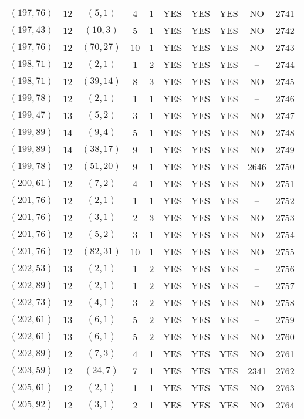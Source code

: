 \begin{longtable}{|c|c|c|c|c|c|c|c|c|c|}
$(197, 76)$ & 12 & $(5, 1)$ & 4 & 1 & YES & YES & YES & NO & 2741\\
$(197, 43)$ & 12 & $(10, 3)$ & 5 & 1 & YES & YES & YES & NO & 2742\\
$(197, 76)$ & 12 & $(70, 27)$ & 10 & 1 & YES & YES & YES & NO & 2743\\
$(198, 71)$ & 12 & $(2, 1)$ & 1 & 2 & YES & YES & YES & -- & 2744\\
$(198, 71)$ & 12 & $(39, 14)$ & 8 & 3 & YES & YES & YES & NO & 2745\\
$(199, 78)$ & 12 & $(2, 1)$ & 1 & 1 & YES & YES & YES & -- & 2746\\
$(199, 47)$ & 13 & $(5, 2)$ & 3 & 1 & YES & YES & YES & NO & 2747\\
$(199, 89)$ & 14 & $(9, 4)$ & 5 & 1 & YES & YES & YES & NO & 2748\\
$(199, 89)$ & 14 & $(38, 17)$ & 9 & 1 & YES & YES & YES & NO & 2749\\
$(199, 78)$ & 12 & $(51, 20)$ & 9 & 1 & YES & YES & YES & 2646 & 2750\\
$(200, 61)$ & 12 & $(7, 2)$ & 4 & 1 & YES & YES & YES & NO & 2751\\
$(201, 76)$ & 12 & $(2, 1)$ & 1 & 1 & YES & YES & YES & -- & 2752\\
$(201, 76)$ & 12 & $(3, 1)$ & 2 & 3 & YES & YES & YES & NO & 2753\\
$(201, 76)$ & 12 & $(5, 2)$ & 3 & 1 & YES & YES & YES & NO & 2754\\
$(201, 76)$ & 12 & $(82, 31)$ & 10 & 1 & YES & YES & YES & NO & 2755\\
$(202, 53)$ & 13 & $(2, 1)$ & 1 & 2 & YES & YES & YES & -- & 2756\\
$(202, 89)$ & 12 & $(2, 1)$ & 1 & 2 & YES & YES & YES & -- & 2757\\
$(202, 73)$ & 12 & $(4, 1)$ & 3 & 2 & YES & YES & YES & NO & 2758\\
$(202, 61)$ & 13 & $(6, 1)$ & 5 & 2 & YES & YES & YES & -- & 2759\\
$(202, 61)$ & 13 & $(6, 1)$ & 5 & 2 & YES & YES & YES & NO & 2760\\
$(202, 89)$ & 12 & $(7, 3)$ & 4 & 1 & YES & YES & YES & NO & 2761\\
$(203, 59)$ & 12 & $(24, 7)$ & 7 & 1 & YES & YES & YES & 2341 & 2762\\
$(205, 61)$ & 12 & $(2, 1)$ & 1 & 1 & YES & YES & YES & NO & 2763\\
$(205, 92)$ & 12 & $(3, 1)$ & 2 & 1 & YES & YES & YES & NO & 2764\\

\end{longtable}
